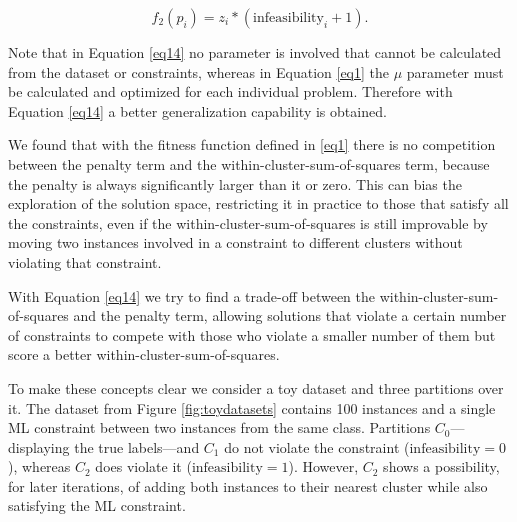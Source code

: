 \begin{equation}
f_2(p_i) = z_i * (\text{infeasibility}_i + 1).
\label{eq14}
\end{equation}

Note that in Equation \eqref{eq14} no parameter is involved that cannot be calculated from the dataset or constraints, whereas in Equation \eqref{eq1} the $\mu$ parameter must be calculated and optimized for each individual problem. Therefore with Equation \eqref{eq14} a better generalization capability is obtained.

We found that with the fitness function defined in \eqref{eq1} there is no competition between the penalty term and the within-cluster-sum-of-squares term, because the penalty is always significantly larger than it or zero. This can bias the exploration of the solution space, restricting it in practice to those that satisfy all the constraints, even if the within-cluster-sum-of-squares is still improvable by moving two instances involved in a constraint to different clusters without violating that constraint.

With Equation \eqref{eq14} we try to find a trade-off between the within-cluster-sum-of-squares and the penalty term, allowing solutions that violate a certain number of constraints to compete with those who violate a smaller number of them but score a better within-cluster-sum-of-squares.

To make these concepts clear we consider a toy dataset and three partitions over it. The dataset from Figure \ref{fig:toydatasets} contains 100 instances and a single \acs{ML} constraint between two instances from the same class. Partitions $C_0$---displaying the true labels---and $C_1$ do not violate the constraint ($\text{infeasibility} = 0$), whereas $C_2$ does violate it ($\text{infeasibility} = 1$). However, $C_2$ shows a possibility, for later iterations, of adding both instances to their nearest cluster while also satisfying the \acs{ML} constraint.

